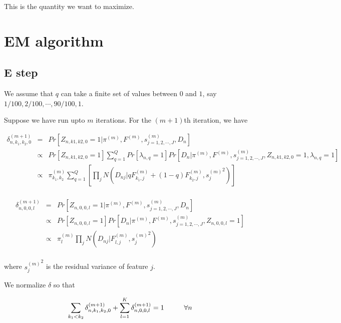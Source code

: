 \documentclass[11pt,authoryear]{article}
\begin{document}
This is the quantity we want to maximize. 

\section{EM algorithm}
\subsection{E step}

We assume that $q$ can take a finite set of values between $0$ and $1$, 
say $1/100, 2/100, \cdots, 90/100, 1$.

Suppose we have run upto $m$ iterations. For the $(m+1)$th iteration, we have 

\begin{eqnarray} \nonumber
\delta^{(m+1)}_{n, k_1, k_2, 0} &=& Pr \left [ Z_{n, k1, k2, 0} = 1 | \pi^{(m)}, F^{(m)}, s^{(m)}_{j=1,2,\cdots,J}, D_{n} \right ] \\ \nonumber
 &\propto& Pr \left [ Z_{n, k1, k2,0} = 1 \right] \sum_{q=1}^{Q} Pr \left [ \lambda_{n,q} = 1 \right] Pr \left [ D_{n} | \pi^{(m)}, F^{(m)}, s^{(m)}_{j=1,2,\cdots,J}, Z_{n, k1, k2, 0}= 1, \lambda_{n, q}=1 \right] \\ \nonumber
 &\propto& \pi^{(m)}_{k_1,k_2} \sum_{q=1}^{Q} \left [ \prod_{j} N \left (D_{nj} | qF^{(m)}_{k_1,j} + (1-q)F^{(m)}_{k_2,j}, {s_j^{(m)}}^2 \right) \right ] \\ \nonumber
\end{eqnarray}

\begin{eqnarray} \nonumber
\delta^{(m+1)}_{n, 0, 0, l}  &=& Pr \left [ Z_{n, 0, 0, l} = 1  |  \pi^{(m)}, F^{(m)}, s^{(m)}_{j=1,2,\cdots,J}, D_{n} \right ] \\ \nonumber 
& \propto & Pr \left [ Z_{n, 0, 0, l} = 1 \right] Pr \left [ D_{n} | \pi^{(m)}, F^{(m)}, s^{(m)}_{j=1,2,\cdots,J}, Z_{n, 0, 0, l}= 1 \right] \\ \nonumber 
& \propto & \pi^{(m)}_{l}  \prod_{j} N \left (D_{nj} | F^{(m)}_{l,j} , {s_j^{(m)}}^2 \right) \\  \nonumber
\end{eqnarray}


where ${s_j^{(m)}}^2$ is the residual variance of feature $j$.

We normalize $\delta$ so that 

$$ \sum_{k_1 < k_2} \delta^{(m+1)}_{n, k_1, k_2, 0}  + \sum_{l=1}^{K} \delta^{(m+1)}_{n, 0, 0, l}= 1 \hspace{1 cm} \forall n $$
\end{document}
